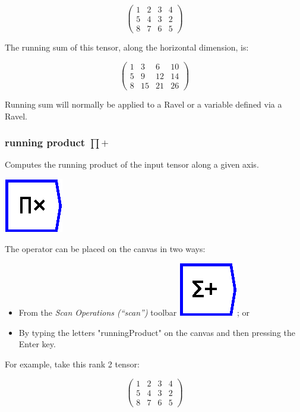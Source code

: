\[
\left(\begin{array}{cccc}
1 & 2 & 3 & 4\\
5 & 4 & 3 & 2\\
8 & 7 & 6 & 5
\end{array}\right)
\]

The running sum of this tensor, along the horizontal dimension, is:

\[
\left(\begin{array}{cccc}
1 & 3 & 6 & 10\\
5 & 9 & 12 & 14\\
8 & 15 & 21 & 26
\end{array}\right)
\]

Running sum will normally be applied to a Ravel or a variable defined
via a Ravel.

\subsubsection{running product $\prod+$}

\label{Operation:runningProduct} Computes the running product of
the input tensor along a given axis.

\includegraphics{images/runningProduct}

The operator can be placed on the canvas in two ways:
\begin{itemize}
\item From the \emph{Scan Operations (``scan'')} toolbar \includegraphics{images/runningSum};
or 
\item By typing the letters "runningProduct" on the canvas and then pressing
the Enter key.
\end{itemize}
For example, take this rank 2 tensor:

\[
\left(\begin{array}{cccc}
1 & 2 & 3 & 4\\
5 & 4 & 3 & 2\\
8 & 7 & 6 & 5
\end{array}\right)
\]

